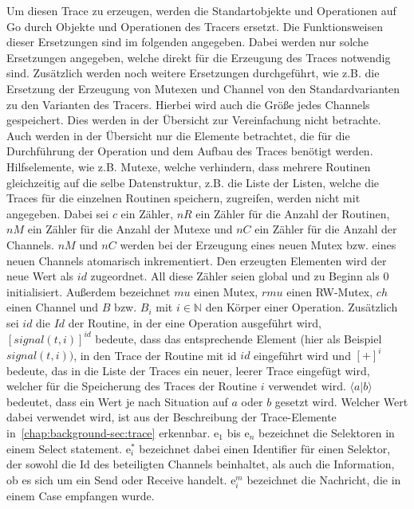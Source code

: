 Um diesen Trace zu erzeugen, werden die Standartobjekte und Operationen auf 
Go durch Objekte und Operationen 
des Tracers ersetzt. Die Funktionsweisen dieser Ersetzungen sind im folgenden 
angegeben. Dabei werden nur solche Ersetzungen angegeben, welche direkt 
für die Erzeugung
des Traces notwendig sind. Zusätzlich werden noch 
weitere Ersetzungen durchgeführt, wie z.B. die Ersetzung der Erzeugung von 
Mutexen und Channel von den Standardvarianten zu den Varianten des Tracers.
Hierbei wird auch die Größe jedes Channels gespeichert.
Dies werden in der Übersicht zur Vereinfachung nicht betrachte. Auch werden 
in der Übersicht nur die Elemente betrachtet, die für die Durchführung der 
Operation und dem Aufbau des Traces benötigt werden. Hilfselemente, wie z.B. 
Mutexe, welche verhindern, dass mehrere Routinen gleichzeitig auf die selbe 
Datenstruktur, 
z.B. die Liste der Listen, welche die Traces für die einzelnen Routinen 
speichern, zugreifen, werden nicht mit angegeben. Dabei sei $c$ ein 
Zähler, $nR$ ein Zähler für die Anzahl der Routinen, $nM$ ein Zähler für die 
Anzahl der Mutexe und $nC$ ein Zähler für die Anzahl der Channels. $nM$ und $nC$
werden bei der Erzeugung eines neuen Mutex bzw. eines neuen Channels atomarisch 
inkrementiert. Den erzeugten Elementen wird der neue Wert als $id$ zugeordnet. All diese 
Zähler seien global und zu Beginn als $0$ initialisiert. Außerdem bezeichnet 
$mu$ einen Mutex, $rmu$ einen RW-Mutex, $ch$ einen Channel und $B$ bzw. $B_i$
mit $i\in\mathbb{N}$ den 
Körper einer Operation. Zusätzlich
sei $id$ die $Id$ der Routine, in der eine Operation ausgeführt wird,
$[signal(t, i)]^{id}$ bedeute, dass das entsprechende Element (hier als 
Beispiel $signal(t, i))$, in den Trace der Routine mit id $id$ eingeführt wird
und $[+]^i$ bedeute, das in die Liste der Traces ein neuer, leerer Trace 
eingefügt wird, welcher für die Speicherung des Traces der Routine $i$ 
verwendet wird. 
$\langle a|b\rangle$ bedeutet, dass ein Wert je nach Situation auf $a$ oder $b$ gesetzt 
wird. Welcher Wert dabei verwendet wird, ist aus der Beschreibung der 
Trace-Elemente in~\ref{chap:background-sec:trace} erkennbar. 
$\text{e}_1$ bis $\text{e}_n$ bezeichnet die Selektoren in einem Select statement.
$\text{e}_i^*$ bezeichnet dabei einen Identifier für einen Selektor, der sowohl die 
Id des beteiligten Channels beinhaltet, als auch die Information, ob es sich um ein 
Send oder Receive handelt. $\text{e}_i^m$ bezeichnet die Nachricht, die in einem Case 
empfangen wurde. 

